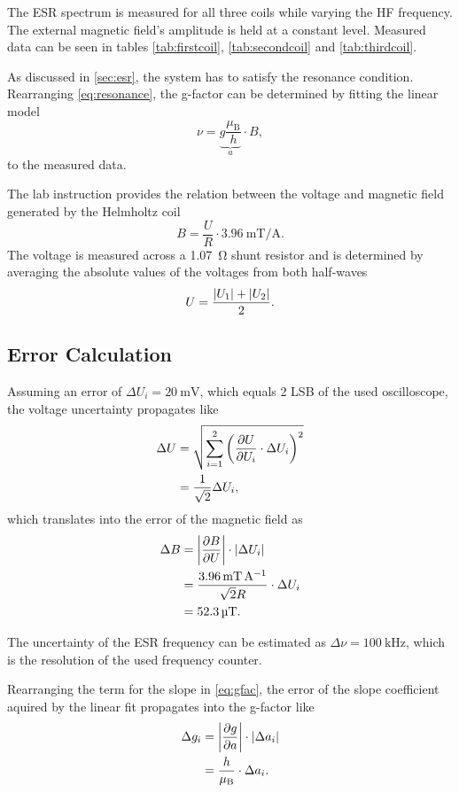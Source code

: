 The ESR spectrum is measured for all three coils while varying the HF frequency.
The external magnetic field's amplitude is held at a constant level.
Measured data can be seen in tables \ref{tab:firstcoil}, \ref{tab:secondcoil} and \ref{tab:thirdcoil}.

As discussed in \autoref{sec:esr}, the system has to satisfy the resonance condition.
Rearranging \autoref{eq:resonance}, the g-factor can be determined by fitting the linear model
\begin{equation}\label{eq:gfac}
	\nu=\underbrace{g\frac{\mu_\text{B}}{h}}_a \cdot B,
\end{equation}
to the measured data.

The lab instruction provides the relation between the voltage and magnetic field generated by the Helmholtz coil
\begin{equation}\label{eq:extfield}
	B=\frac{U}{R}\cdot\SI{3.96}{\milli\tesla\per\ampere}.
\end{equation}
The voltage is measured across a \SI{1.07}{\ohm} shunt resistor and is determined by averaging the absolute values of the voltages from both half-waves
\begin{equation*}
	U = \frac{\left| U_1 \right|+\left| U_2 \right|}{2}.
\end{equation*}

\subsection{Error Calculation}
Assuming an error of $\Delta U_i=\SI{20}{\mV}$, which equals 2 LSB of the used oscilloscope, the voltage uncertainty propagates like
\begin{alignat*}{2}
	\Delta U &= \sqrt{\sum^2_{i=1}\left(\frac{\partial U}{\partial U_i}\cdot \Delta U_i\right)^2} \\
	&=\frac{1}{\sqrt{2}}\Delta U_i,
\end{alignat*}
which translates into the error of the magnetic field as
\begin{alignat*}{2}
	\Delta B &= \left| \frac{\partial B}{\partial U} \right|\cdot \left| \Delta U_i \right| \\
	&= \frac{\SI{3.96}{\milli\tesla\per\ampere}}{\sqrt{2}R}\cdot\Delta U_i \\
	&= \SI{52.3}{\micro\tesla}.
\end{alignat*}

The uncertainty of the ESR frequency can be estimated as $\Delta\nu = \SI{100}{\kHz}$, which is the resolution of the used frequency counter.

Rearranging the term for the slope in \autoref{eq:gfac}, the error of the slope coefficient aquired by the linear fit propagates into the g-factor like
\begin{alignat*}{2}
	\Delta g_i &= \left| \frac{\partial g}{\partial a} \right|\cdot \left| \Delta a_i \right| \\
	&= \frac{h}{\mu_\text{B}}\cdot\Delta a_i.
\end{alignat*}

